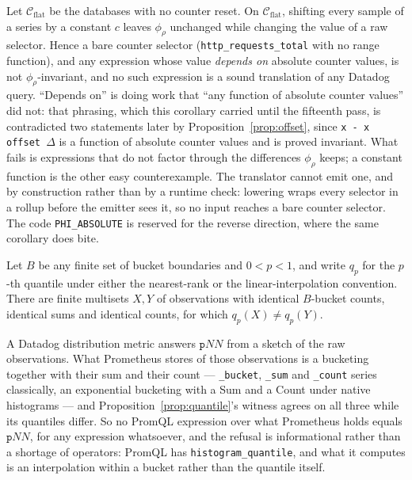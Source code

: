 \begin{corollary}\label{cor:raw}
Let $\mathcal{C}_{\mathrm{flat}}$ be the databases with no counter reset. On
$\mathcal{C}_{\mathrm{flat}}$, shifting every sample of a series by a constant $c$ leaves
$\phi_\rho$ unchanged while changing the value of a raw selector. Hence a bare counter
selector (\texttt{http\_requests\_total} with no range function), and any expression
whose value \emph{depends on} absolute counter values, is not $\phi_\rho$-invariant, and
no such expression is a sound translation of any Datadog query. ``Depends on'' is doing
work that ``any function of absolute counter values'' did not: that phrasing, which this
corollary carried until the fifteenth pass, is contradicted two statements later by
Proposition~\ref{prop:offset}, since \texttt{x - x offset $\Delta$} is a function of
absolute counter values and is proved invariant. What fails is expressions that do not
factor through the differences $\phi_\rho$ keeps; a constant function is the other easy
counterexample. The translator cannot emit one, and by construction
rather than by a runtime check: lowering wraps every selector in a rollup before the
emitter sees it, so no input reaches a bare counter selector. The code
\texttt{PHI\_ABSOLUTE} is reserved for the reverse direction, where the same corollary
does bite.
\end{corollary}

\begin{proposition}\label{prop:quantile}
Let $B$ be any finite set of bucket boundaries and $0<p<1$, and write $q_p$ for the
$p$-th quantile under either the nearest-rank or the linear-interpolation convention.
There are finite multisets $X,Y$ of observations with identical $B$-bucket counts,
identical sums and identical counts, for which $q_p(X)\neq q_p(Y)$.
\end{proposition}
\iffull\fi

\begin{corollary}%
\label{cor:quantile}
A Datadog distribution metric answers $\mathtt{p}NN$ from a sketch of the raw
observations. What Prometheus stores of those observations is a bucketing together with
their sum and their count --- \texttt{\_bucket}, \texttt{\_sum} and \texttt{\_count}
series classically, an exponential bucketing with a Sum and a Count under native
histograms --- and Proposition~\ref{prop:quantile}'s witness agrees on all three while
its quantiles differ. So no PromQL expression over what Prometheus holds equals
$\mathtt{p}NN$, for any expression whatsoever, and the refusal is informational rather
than a shortage of operators: PromQL has \texttt{histogram\_quantile}, and what it
computes is an interpolation within a bucket rather than the quantile itself.
\end{corollary}

